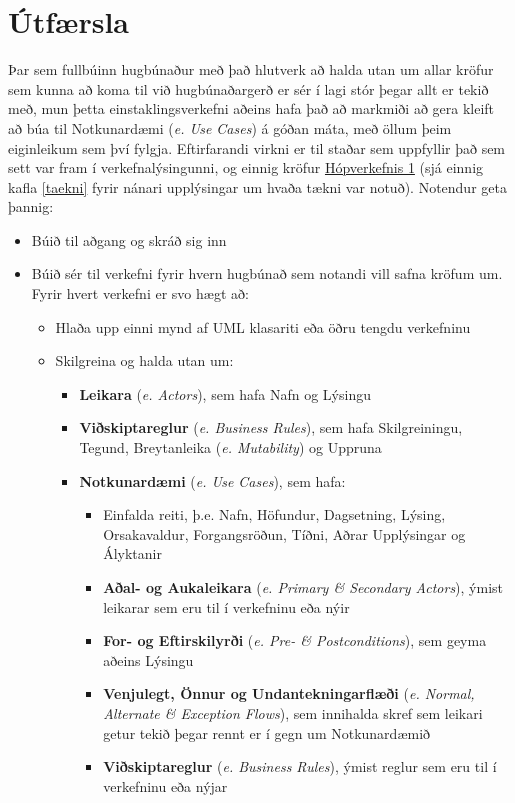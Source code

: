 \documentclass[a4paper,11pt]{article}\usepackage[pdftex]{graphicx}\usepackage[]{xcolor}
\begin{document}
\section{Útfærsla}
Þar sem fullbúinn hugbúnaður með það hlutverk að halda utan um allar kröfur sem kunna að koma til við hugbúnaðargerð er sér í lagi stór þegar allt er tekið með, mun þetta einstaklingsverkefni aðeins hafa það að markmiði að gera kleift að búa til Notkunardæmi (\textit{e. Use Cases}) á góðan máta, með öllum þeim eiginleikum sem því fylgja. Eftirfarandi virkni er til staðar sem uppfyllir það sem sett var fram í verkefnalýsingunni, og einnig kröfur \href{https://github.com/vefforritun/vef2-2025-h1}{Hópverkefnis 1} (sjá einnig kafla \ref{taekni} fyrir nánari upplýsingar um hvaða tækni var notuð). Notendur geta þannig: 
\begin{itemize}
    \item Búið til aðgang og skráð sig inn
    \item Búið sér til verkefni fyrir hvern hugbúnað sem notandi vill safna kröfum um. Fyrir hvert verkefni er svo hægt að:
    \begin{itemize}
        \item Hlaða upp einni mynd af UML klasariti eða öðru tengdu verkefninu 
        \item Skilgreina og halda utan um:
        \begin{itemize}
            \item \textbf{Leikara} (\textit{e. Actors}), sem hafa Nafn og Lýsingu
            \item \textbf{Viðskiptareglur} (\textit{e. Business Rules}), sem hafa Skilgreiningu, Tegund, Breytanleika (\textit{e. Mutability}) og Uppruna
            \item \textbf{Notkunardæmi} (\textit{e. Use Cases}), sem hafa:
            \begin{itemize}
                \item Einfalda reiti, þ.e. Nafn, Höfundur, Dagsetning, Lýsing, Orsakavaldur, Forgangsröðun, Tíðni, Aðrar Upplýsingar og Ályktanir
                \item \textbf{Aðal- og Aukaleikara} (\textit{e. Primary \& Secondary Actors}), ýmist leikarar sem eru til í verkefninu eða nýir
                \item \textbf{For- og Eftirskilyrði} (\textit{e. Pre- \& Postconditions}), sem geyma aðeins Lýsingu
                \item \textbf{Venjulegt, Önnur og Undantekningarflæði} (\textit{e. Normal, Alternate \& Exception Flows}), sem innihalda skref sem leikari getur tekið þegar rennt er í gegn um Notkunardæmið
                \item \textbf{Viðskiptareglur} (\textit{e. Business Rules}), ýmist reglur sem eru til í verkefninu eða nýjar
            \end{itemize}
        \end{itemize}
    \end{itemize}
\end{itemize}
\end{document}
